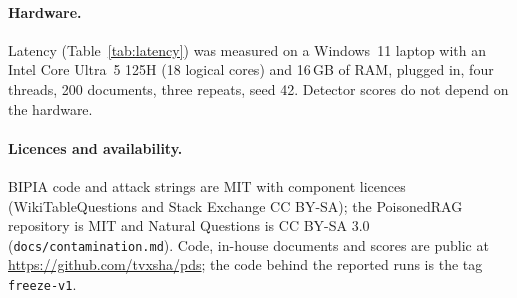 \paragraph{Hardware.}
Latency (Table~\ref{tab:latency}) was measured on a Windows~11 laptop with an
Intel Core Ultra~5 125H (18 logical cores) and 16\,GB of RAM, plugged in, four
threads, 200 documents, three repeats, seed 42. Detector scores do not depend on
the hardware.

\paragraph{Licences and availability.}
BIPIA code and attack strings are MIT with component licences (WikiTableQuestions
and Stack Exchange CC BY-SA); the PoisonedRAG repository is MIT and Natural
Questions is CC BY-SA 3.0 (\texttt{docs/contamination.md}). Code, in-house
documents and scores are public at \url{https://github.com/tvxsha/pds}; the code
behind the reported runs is the tag \texttt{freeze-v1}.